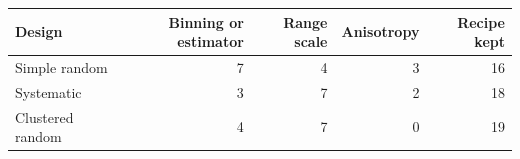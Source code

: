 \begin{tabular}{lrrrr}
\toprule
Design & Binning or estimator & Range scale & Anisotropy & Recipe kept \\
\midrule
Simple random & 7 & 4 & 3 & 16 \\
Systematic & 3 & 7 & 2 & 18 \\
Clustered random & 4 & 7 & 0 & 19 \\
\bottomrule
\end{tabular}
